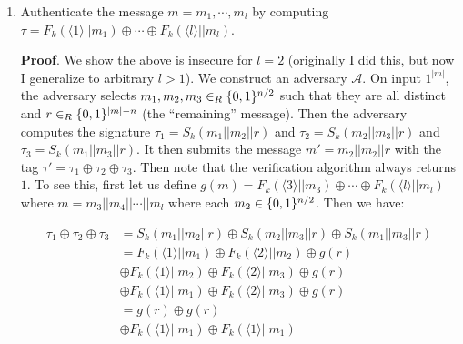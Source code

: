 \documentclass{article}
\begin{document}
\begin{enumerate}
\begin{enumerate}[noitemsep,topsep=\mdcompacttopsep,label=\alph*.]
\item{}Authenticate the message $m = m_1, \cdots, m_l$ by computing 
$\tau = F_k(\langle 1 \rangle || m_1) \oplus \cdots \oplus F_k(\langle l \rangle || m_l)$.

\begin{mdbmarginx}{1ex}{0pt}{1ex}{0pt}%
\noindent{}\textbf{Proof}.  We show the above is insecure for $l = 2$ (originally I did this, but now I generalize to
arbitrary $l > 1$). 
We construct an adversary $\mathcal{A}$.
On input $1^{|m|}$, the adversary selects $m_1,m_2,m_3 \in_R \{0,1\}^{n/2}$ such
that they are all distinct and $r \in_R \{0,1\}^{|m| - n}$ (the \textquotedblleft{}remaining\textquotedblright{} message). 
Then the adversary computes the signature $\tau_1 = S_k(m_1 || m_2 || r)$
and $\tau_2 = S_k(m_2 || m_3|| r)$ and $\tau_3 = S_k(m_1 || m_3 || r)$. It then
submits the message $m' = m_2 || m_2|| r$ with the tag $\tau '= \tau_1 \oplus \tau_2 \oplus \tau_3$.
Then note that the verification algorithm always returns $1$. To see this, first let us define
$g(m) = F_k(\langle 3 \rangle || m_3) \oplus \cdots \oplus F_k(\langle l \rangle || m_l)$ where
$m = m_3 || m_4 || \cdots|| m_l$ where each $m_2 \in \{0,1\}^{n/2}$. Then we have:%
\end{mdbmarginx}%
\noindent\noindent\[%
\begin{aligned}
\tau_1 \oplus \tau_2 \oplus \tau_3 &= S_k(m_1 || m_2 || r) \oplus S_k(m_2 || m_3 || r) \oplus S_k(m_1 || m_3 || r) \\
&= F_k(\langle 1 \rangle || m_1) \oplus F_k(\langle 2 \rangle || m_2) \oplus g(r)\\
& \oplus F_k(\langle 1 \rangle || m_2) \oplus F_k(\langle 2 \rangle || m_3) \oplus g(r) \\
&\oplus F_k(\langle 1 \rangle || m_1) \oplus F_k(\langle 2 \rangle || m_3) \oplus g(r) \\
&= g(r) \oplus g(r) \\
&\oplus F_k(\langle 1 \rangle || m_1) \oplus F_k(\langle 1 \rangle || m_1) \\

\end{aligned}\]
\end{enumerate}
\end{enumerate}
\end{document}
